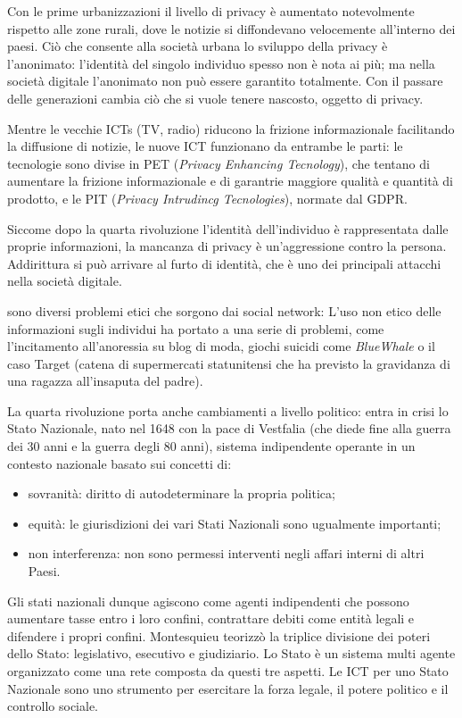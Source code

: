 \documentclass[a4page, 11pt]{article}
\begin{document}
Con le prime urbanizzazioni il livello di privacy è aumentato notevolmente rispetto alle zone rurali, dove le notizie si diffondevano velocemente all'interno dei paesi.
Ciò che consente alla società urbana lo sviluppo della privacy è l'anonimato: l'identità del singolo individuo spesso non è nota ai più; ma nella società digitale l'anonimato non può essere garantito totalmente.
Con il passare delle generazioni cambia ciò che si vuole tenere nascosto, oggetto di privacy.

Mentre le vecchie ICTs (TV, radio) riducono la frizione informazionale facilitando la diffusione di notizie, le nuove ICT funzionano da entrambe le parti: le tecnologie sono divise in PET (\textit{Privacy Enhancing Tecnology}), che tentano di aumentare la frizione informazionale e di garantrie maggiore qualità e quantità di prodotto, e le PIT (\textit{Privacy Intrudincg Tecnologies}), normate dal GDPR.

Siccome dopo la quarta rivoluzione l'identità dell'individuo è rappresentata dalle proprie informazioni, la mancanza di privacy è un'aggressione contro la persona.
Addirittura si può arrivare al furto di identità, che è uno dei principali attacchi nella società digitale.


sono diversi problemi etici che sorgono dai social network:
L'uso non etico delle informazioni sugli individui ha portato a una serie di problemi, come l'incitamento all'anoressia su blog di moda, giochi suicidi come \textit{BlueWhale} o il caso Target (catena di supermercati statunitensi che ha previsto la gravidanza di una ragazza all'insaputa del padre).

La quarta rivoluzione porta anche cambiamenti a livello politico: entra in crisi lo Stato Nazionale, nato nel 1648 con la pace di Vestfalia (che diede fine alla guerra dei 30 anni e la guerra degli 80 anni), sistema indipendente operante in un contesto nazionale basato sui concetti di:
\begin{itemize}
  \item sovranità: diritto di autodeterminare la propria politica;
  \item equità: le giurisdizioni dei vari Stati Nazionali sono ugualmente importanti;
  \item non interferenza: non sono permessi interventi negli affari interni di altri Paesi.
\end{itemize}
Gli stati nazionali dunque agiscono come agenti indipendenti che possono aumentare tasse entro i loro confini, contrattare debiti come entità legali e difendere i propri confini.
Montesquieu teorizzò la triplice divisione dei poteri dello Stato: legislativo, esecutivo e giudiziario.
Lo Stato è un sistema multi agente organizzato come una rete composta da questi tre aspetti.
Le ICT per uno Stato Nazionale sono uno strumento per esercitare la forza legale, il potere politico e il controllo sociale.
\end{document}
